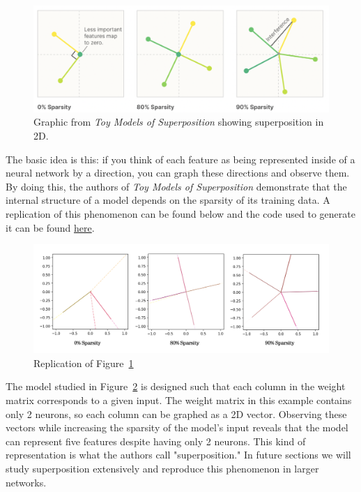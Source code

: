 \documentclass{article} %
\begin{document}
\begin{figure}[h]
    \centering
    \includegraphics[width=0.55\linewidth]{introduction/images/introduction_anthropic_graphic_.png}
    \captionsetup{font=footnotesize} %
    \caption{
        Graphic from \textit{Toy Models of Superposition} showing superposition
        in 2D.
    }
    \label{fig:section1_anthropic}
\end{figure}

The basic idea is this: if you think of each feature as being represented inside of a
neural network by a direction, you can graph these directions and observe them.
By doing this, the authors of \textit{Toy Models of Superposition} demonstrate that
the internal structure of a model depends on the sparsity of its training data.
A replication of this phenomenon can be found below and the code used to 
generate it can be found 
\href{https://github.com/zroe1/toy_models_of_superposition/blob/main/section_1/section_1.ipynb}{here}.\\ 

\begin{figure}[h]
    \centering
    \includegraphics[width=0.6\linewidth]{introduction/images/introduction_replicated_graphic.png}
    \captionsetup{font=footnotesize} %
    \caption{Replication of Figure~\ref{fig:section1_anthropic}}
    \label{fig:section1_replication}
\end{figure}

The model studied in  Figure~\ref{fig:section1_replication} is designed such that 
each column in the weight matrix corresponds to a  given input. The weight
matrix in this example contains only 2 neurons, so each column can be graphed as
a 2D vector. Observing these vectors while increasing the sparsity of the model's input reveals
that the model can represent five features despite having only 2 neurons. This 
kind of representation is what the authors call "superposition." In future sections we will study 
superposition extensively and reproduce this phenomenon in larger networks.
\end{document}
